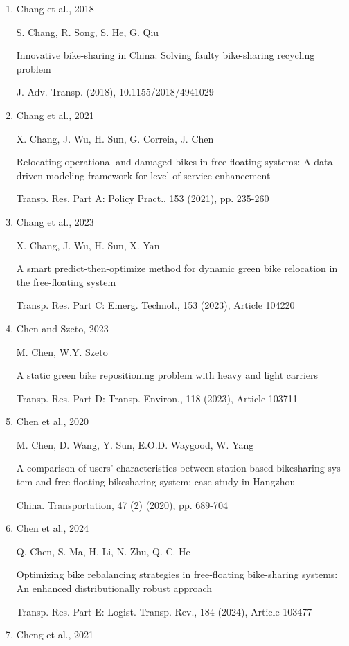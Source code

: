 \documentclass[
  english,
]{article}
\begin{document}
\begin{otherlanguage}{english}
\begin{enumerate}
  Vienna University of Technology (2011)

  Ph.D. Thesis
\item
  Chang et al., 2018

  S. Chang, R. Song, S. He, G. Qiu

  Innovative bike-sharing in China: Solving faulty bike-sharing recycling problem

  J. Adv. Transp. (2018), 10.1155/2018/4941029
\item
  Chang et al., 2021

  X. Chang, J. Wu, H. Sun, G. Correia, J. Chen

  Relocating operational and damaged bikes in free-floating systems: A data-driven modeling
  framework for level of service enhancement

  Transp. Res. Part A: Policy Pract., 153 (2021), pp. 235-260
\item
  Chang et al., 2023

  X. Chang, J. Wu, H. Sun, X. Yan

  A smart predict-then-optimize method for dynamic green bike relocation in the free-floating system

  Transp. Res. Part C: Emerg. Technol., 153 (2023), Article 104220
\item
  Chen and Szeto, 2023

  M. Chen, W.Y. Szeto

  A static green bike repositioning problem with heavy and light carriers

  Transp. Res. Part D: Transp. Environ., 118 (2023), Article 103711
\item
  Chen et al., 2020

  M. Chen, D. Wang, Y. Sun, E.O.D. Waygood, W. Yang

  A comparison of users' characteristics between station-based bikesharing system and free-floating
  bikesharing system: case study in Hangzhou

  China. Transportation, 47 (2) (2020), pp. 689-704
\item
  Chen et al., 2024

  Q. Chen, S. Ma, H. Li, N. Zhu, Q.-C. He

  Optimizing bike rebalancing strategies in free-floating bike-sharing systems: An enhanced
  distributionally robust approach

  Transp. Res. Part E: Logist. Transp. Rev., 184 (2024), Article 103477
\item
  Cheng et al., 2021


\end{enumerate}
\end{otherlanguage}
\end{document}
